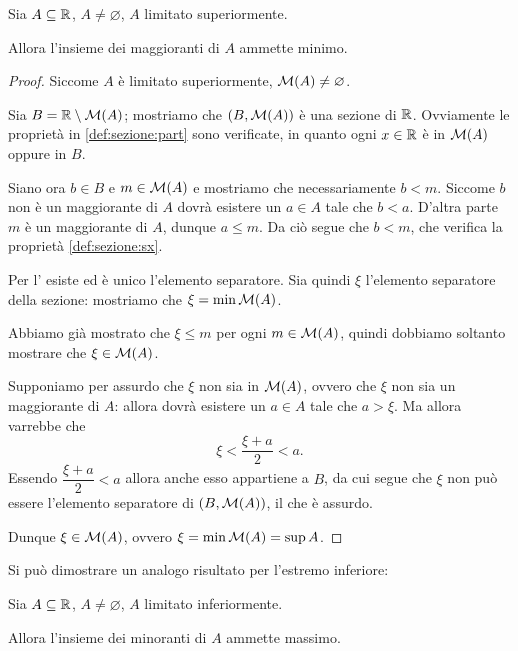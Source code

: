 \begin{theorem}
    Sia $A \subseteq \mathbb{R}$, $A \neq \varnothing$, $A$ limitato superiormente.

    Allora l'insieme dei maggioranti di $A$ ammette minimo.
\end{theorem}
\begin{proof}
    Siccome $A$ è limitato superiormente, $\mathcal{M}(A) \neq \varnothing$. 
    
    Sia $B = \mathbb{R} \setminus \mathcal{M}(A)$; mostriamo che $(B, \mathcal{M}(A))$ è una sezione di $\mathbb{R}$.
    Ovviamente le proprietà in \ref{def:sezione:part} sono verificate, in quanto ogni $x \in \mathbb{R}$ è in $\mathcal{M}(A)$ oppure in $B$.

    Siano ora $b \in B$ e $m \in \mathcal{M}(A)$ e mostriamo che necessariamente $b < m$. Siccome $b$ non è un maggiorante di $A$ dovrà esistere un $a \in A$ tale che $b < a$. D'altra parte $m$ è un maggiorante di $A$, dunque $a \leq m$. Da ciò segue che $b < m$, che verifica la proprietà \ref{def:sezione:sx}.

    Per l' esiste ed è unico l'elemento separatore. Sia quindi $\xi$ l'elemento separatore della sezione: mostriamo che $\xi = \min \mathcal{M}(A)$.

    Abbiamo già mostrato che $\xi \leq m$ per ogni $m \in \mathcal{M}(A)$, quindi dobbiamo soltanto mostrare che $\xi \in \mathcal{M}(A)$. 
    
    Supponiamo per assurdo che $\xi$ non sia in $\mathcal{M}(A)$, ovvero che $\xi$ non sia un maggiorante di $A$: allora dovrà esistere un $a \in A$ tale che $a > \xi$. Ma allora varrebbe che \[
        \xi < \frac{\xi + a}{2} < a.
    \] Essendo $\dfrac{\xi + a}{2} < a$ allora anche esso appartiene a $B$, da cui segue che $\xi$ non può essere l'elemento separatore di $(B, \mathcal{M}(A))$, il che è assurdo.

    Dunque $\xi \in \mathcal{M}(A)$, ovvero $\xi = \min \mathcal{M}(A) = \sup A$.
\end{proof}

Si può dimostrare un analogo risultato per l'estremo inferiore:
\begin{theorem}
    Sia $A \subseteq \mathbb{R}$, $A \neq \varnothing$, $A$ limitato inferiormente.

    Allora l'insieme dei minoranti di $A$ ammette massimo.
\end{theorem}

